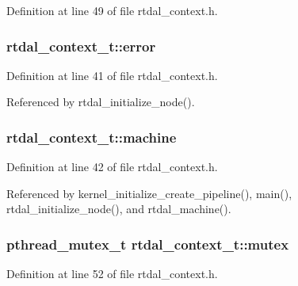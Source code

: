 Definition at line 49 of file rtdal\-\_\-context.\-h.

\hypertarget{structrtdal__context__t_a16a803b2fd237c6c6af02727f13cca78}{
\subsubsection[{error}]{ rtdal\-\_\-context\-\_\-t\-::error}}\label{structrtdal__context__t_a16a803b2fd237c6c6af02727f13cca78}


Definition at line 41 of file rtdal\-\_\-context.\-h.



Referenced by rtdal\-\_\-initialize\-\_\-node().

\hypertarget{structrtdal__context__t_a3eb563f1d3980bcfa87524bd53e6a636}{
\subsubsection[{machine}]{ rtdal\-\_\-context\-\_\-t\-::machine}}\label{structrtdal__context__t_a3eb563f1d3980bcfa87524bd53e6a636}


Definition at line 42 of file rtdal\-\_\-context.\-h.



Referenced by kernel\-\_\-initialize\-\_\-create\-\_\-pipeline(), main(), rtdal\-\_\-initialize\-\_\-node(), and rtdal\-\_\-machine().

\hypertarget{structrtdal__context__t_a3d973ad68e1ace5e912e2d0c5486be0d}{
\subsubsection[{mutex}]{\setlength{\rightskip}{0pt plus 5cm}pthread\-\_\-mutex\-\_\-t rtdal\-\_\-context\-\_\-t\-::mutex}}\label{structrtdal__context__t_a3d973ad68e1ace5e912e2d0c5486be0d}


Definition at line 52 of file rtdal\-\_\-context.\-h.



